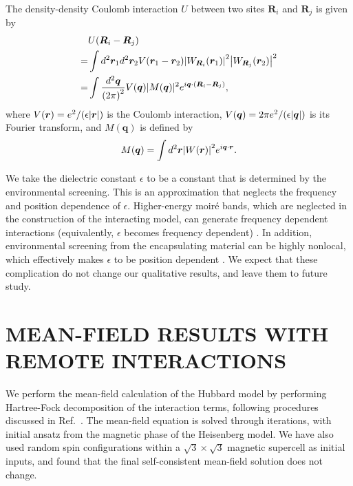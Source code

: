\documentclass[aps,prx,floatfix,twocolumn]{revtex4-1}
\begin{document}
	
	The density-density Coulomb interaction $ U $ between two sites $ \bm{R}_i$ and  $ \bm{R}_j $ is given by
	\begin{equation}\label{eq:U}
	\begin{aligned}
	  &U(\bm{R}_i-\bm{R}_j) \\
	=& \int d^2 \bm{r}_1 d^2 \bm{r}_2 V(\bm{r}_1-\bm{r}_2) \abs{W_{\bm{R}_i}(\bm{r}_1)}^2\abs{W_{\bm{R}_j}(\bm{r}_2)}^2 \\
	=& \int \frac{d^2 \bm{q}}{\qty(2\pi)^2} V(\bm{q}) |M(\bm{q})|^2  e^{i\bm{q}\cdot\qty(\bm{R}_i-\bm{R}_j)} ,
	\end{aligned}
	\end{equation}
	where $ V(\bm{r})=e^2/(\epsilon \abs{\bm{r}}) $ is the Coulomb interaction, $V(\bm{q})=2\pi e^2/(\epsilon\abs{\bm{q}})$ is its Fourier transform, and $M(\bm{q})$ is defined by
	\begin{equation}
	M(\bm{q})=\int d^2\bm{r} \abs{W(\bm{r})}^2 e^{i\bm{q}\cdot \bm{r} }.
	\end{equation}
	
	We take the dielectric constant $\epsilon$ to be a constant that is determined by the environmental screening. This is an approximation that neglects the frequency and position dependence of $\epsilon$. Higher-energy moir\'e bands, which are neglected in the construction of the interacting model, can generate frequency dependent interactions (equivalently, $\epsilon$ becomes frequency dependent) \cite{Aryasetiawan2004}. In addition, environmental screening from the encapsulating material can be highly nonlocal, which effectively makes $\epsilon$ to be position dependent \cite{Cho2018}. We expect that these complication do not change our qualitative results, and leave them to future study.


	
	\section{MEAN-FIELD RESULTS WITH REMOTE INTERACTIONS}
	\label{appB}
	We perform the mean-field calculation of the Hubbard model by performing Hartree-Fock decomposition of the interaction terms, following procedures discussed in Ref.~. The mean-field equation is solved through iterations, with initial ansatz from the  magnetic phase of the Heisenberg model. We have also used random spin configurations within a $\sqrt{3}\times \sqrt{3}$ magnetic supercell as initial inputs, and found that the final self-consistent mean-field solution does not change.
	
\end{document}
